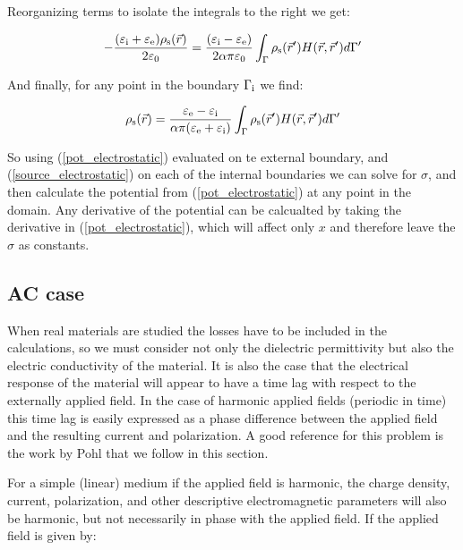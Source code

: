\documentclass[12pt]{report}
\begin{document}
Reorganizing terms to isolate the integrals to the right we get:

\begin{equation}
-\frac{(\varepsilon_{\rm{i}}+\varepsilon_{\rm{e}})\rho_{\rm s}(\vec{r})}{2\varepsilon_0}=\frac{(\varepsilon_{\rm{i}}-\varepsilon_{\rm{e}})}{2\alpha\pi\varepsilon_0}\int_\Gamma{\rho_{\rm s}(\vec{r}^\prime)H(\vec{r},\vec{r}^\prime)d\Gamma^\prime}
\end{equation}

And finally, for any point in the boundary $\Gamma_{\rm{i}}$ we find:

\begin{equation}
\rho_{\rm s}(\vec{r})=\frac{\varepsilon_{\rm{e}}-\varepsilon_{\rm{i}}}{\alpha\pi(\varepsilon_{\rm{e}}+\varepsilon_{\rm{i}})}\int_\Gamma{\rho_{\rm s}(\vec{r}^\prime)H(\vec{r},\vec{r}^\prime)d\Gamma^\prime}\label{source_electrostatic}
\end{equation}

So using (\ref{pot_electrostatic}) evaluated on te external boundary, and (\ref{source_electrostatic}) on each of the internal boundaries we can solve for $\sigma$, and then calculate the potential from (\ref{pot_electrostatic}) at any point in the domain. Any derivative of the potential can be calcualted by taking the derivative in (\ref{pot_electrostatic}), which will affect only $x$ and therefore leave the $\sigma$ as constants.

\subsection{AC case}
When real materials are studied the losses have to be included in the calculations, so we must consider not only the dielectric permittivity but also the electric conductivity of the material. It is also the case that the electrical response of the material will appear to have a time lag with respect to the externally applied field. In the case of harmonic applied fields (periodic in time) this time lag is easily expressed as a phase difference between the applied field and the resulting current and polarization. A good reference for this problem is the work by Pohl \cite{Pohl1978} that we follow in this section.

For a simple (linear) medium if the applied field is harmonic, the charge density, current, polarization, and other descriptive electromagnetic parameters will also be harmonic, but not necessarily in phase with the applied field. If the applied field is given by:
\end{document}

